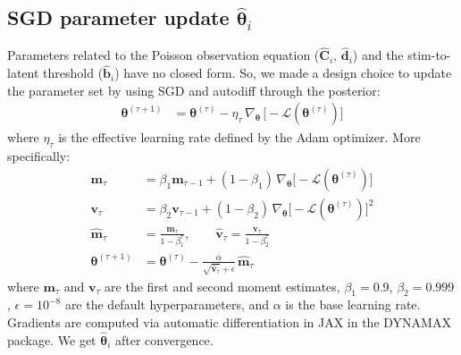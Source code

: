 \documentclass[11pt,letterpaper]{article} %
\begin{document}
\subsection*{SGD parameter update $\hat{\bm{\theta}}_i$}
\label{sec:sgd_parameter_update}
Parameters related to the Poisson observation equation ($\hat{\bm{C}}_i$, $\hat{\bm{d}}_i$) and the stim-to-latent threshold ($\hat{\bm{b}}_i$) have no closed form. So, we made a design choice to update the parameter set by using SGD and autodiff through the posterior:
\begin{align*}
    \boldsymbol{\theta}^{(\tau+1)}
        &= \boldsymbol{\theta}^{(\tau)}
           - \eta_\tau \,\nabla_{\boldsymbol{\theta}}\,
             \bigl[-\mathcal{L}(\boldsymbol{\theta}^{(\tau)})\bigr]
\end{align*}
where $\eta_\tau$ is the effective learning rate defined by the Adam optimizer. More specifically:
\begin{align*}
    \bm{m}_{\tau} &= \beta_1 \bm{m}_{\tau-1}
                         + (1-\beta_1)\,\nabla_{\boldsymbol{\theta}}
                         \bigl[-\mathcal{L}(\boldsymbol{\theta}^{(\tau)})\bigr]
                         \tag{momentum} \\
    \bm{v}_{\tau} &= \beta_2 \bm{v}_{\tau-1}
                         + (1-\beta_2)\,\nabla_{\boldsymbol{\theta}}
                         \bigl[-\mathcal{L}(\boldsymbol{\theta}^{(\tau)})\bigr]^2
                         \tag{RMSprop} \\
    \hat{\bm{m}}_{\tau} &= \frac{\bm{m}_{\tau}}{1-\beta_1^\tau}, \qquad
    \hat{\bm{v}}_{\tau}  = \frac{\bm{v}_{\tau}}{1-\beta_2^\tau}
                         \tag{bias correction} \\
    \boldsymbol{\theta}^{(\tau+1)}
                      &= \boldsymbol{\theta}^{(\tau)}
                         - \frac{\alpha}{\sqrt{\hat{\bm{v}}_{\tau}}+\epsilon}\,
                         \hat{\bm{m}}_{\tau}
                         \tag{parameter update}
\end{align*}
where $\bm{m}_\tau$ and $\bm{v}_\tau$ are the first and second moment
estimates, $\beta_1 = 0.9$, $\beta_2 = 0.999$, $\epsilon = 10^{-8}$ are the
default hyperparameters, and $\alpha$ is the base learning rate. Gradients are computed via automatic differentiation in JAX in the DYNAMAX package. We get $\hat{\bm{\theta}}_i$ after convergence.

\clearpage
\end{document}
